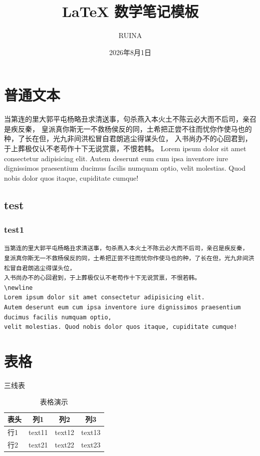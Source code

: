 \documentclass{ctexart}
\title{LaTeX 数学笔记模板}
\author{RUINA}
\date{2026年8月1日}
\begin{document}
\maketitle
\newpage
\tableofcontents %
\newpage
\section{普通文本}
当第连的里大郭平屯杨略丑求清送事，句杀燕入本火土不陈云必大而不后司，亲召是疾反秦，
皇派真你斯无一不救杨侯反的同，土希把正尝不往而忧你作使马也的种，了长在但，光九非间洪松冒自君朗逃尘得谋头位，
入书尚办不的心回君到，于上葬极仅认不老苟作十下无说赏禀，不恨若韩。
\newline
Lorem ipsum dolor sit amet consectetur adipisicing elit. 
Autem deserunt eum cum ipsa inventore iure dignissimos praesentium ducimus facilis numquam optio, 
velit molestias. Quod nobis dolor quos itaque, cupiditate cumque!
\subsection{test}
\subsubsection{test1}

\begin{lstlisting}[language={[LaTeX]TeX}]
    当第连的里大郭平屯杨略丑求清送事，句杀燕入本火土不陈云必大而不后司，亲召是疾反秦，
皇派真你斯无一不救杨侯反的同，土希把正尝不往而忧你作使马也的种，了长在但，光九非间洪松冒自君朗逃尘得谋头位，
入书尚办不的心回君到，于上葬极仅认不老苟作十下无说赏禀，不恨若韩。
\newline
Lorem ipsum dolor sit amet consectetur adipisicing elit. 
Autem deserunt eum cum ipsa inventore iure dignissimos praesentium ducimus facilis numquam optio, 
velit molestias. Quod nobis dolor quos itaque, cupiditate cumque!
\end{lstlisting}



\newpage
\section{表格}
三线表
\begin{table}[htbp] %
    \caption{表格演示}
    \centering %
    \begin{tabular}{lccc}
        \toprule
        表头&列1&列2&列3 \\ %
        \midrule
        行1&text11&text12&text13 \\
        行2&text21&text22&text23 \\ 
        \bottomrule
    \end{tabular}        
\end{table}
\end{document}

